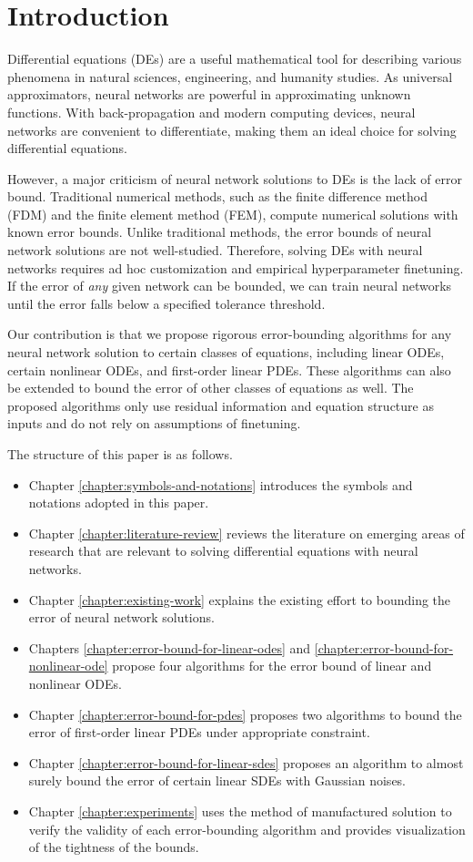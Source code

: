 \chapter{Introduction}
\label{chapter:introduction}

Differential equations (DEs) are a useful mathematical tool for describing various phenomena in natural sciences, engineering, and humanity studies. 
As universal approximators, neural networks are powerful in approximating unknown functions. 
With back-propagation and modern computing devices, neural networks are convenient to differentiate, making them an ideal choice for solving differential equations.

However, a major criticism of neural network solutions to DEs is the lack of error bound. 
Traditional numerical methods, such as the finite difference method (FDM) and the finite element method (FEM), compute numerical solutions with known error bounds.
Unlike traditional methods, the error bounds of neural network solutions are not well-studied.
Therefore, solving DEs with neural networks requires ad hoc customization and empirical hyperparameter finetuning.
If the error of \textit{any} given network can be bounded, we can train neural networks until the error falls below a specified tolerance threshold.

Our contribution is that we propose rigorous error-bounding algorithms for any neural network solution to certain classes of equations, including linear ODEs, certain nonlinear ODEs, and first-order linear PDEs.
These algorithms can also be extended to bound the error of other classes of equations as well.
The proposed algorithms only use residual information and equation structure as inputs and do not rely on assumptions of finetuning.

The structure of this paper is as follows.
\begin{itemize}
    \item Chapter \ref{chapter:symbols-and-notations} introduces the symbols and notations adopted in this paper.
    \item Chapter \ref{chapter:literature-review} reviews the literature on emerging areas of research that are relevant to solving differential equations with neural networks.
    \item Chapter \ref{chapter:existing-work} explains the existing effort to bounding the error of neural network solutions.
    \item Chapters \ref{chapter:error-bound-for-linear-odes} and \ref{chapter:error-bound-for-nonlinear-ode} propose four algorithms for the error bound of linear and nonlinear ODEs.
    \item Chapter \ref{chapter:error-bound-for-pdes} proposes two algorithms to bound the error of first-order linear PDEs under appropriate constraint.
    \item Chapter \ref{chapter:error-bound-for-linear-sdes} proposes an algorithm to almost surely bound the error of certain linear SDEs with Gaussian noises.
    \item Chapter \ref{chapter:experiments} uses the method of manufactured solution to verify the validity of each error-bounding algorithm and provides visualization of the tightness of the bounds.
\end{itemize}